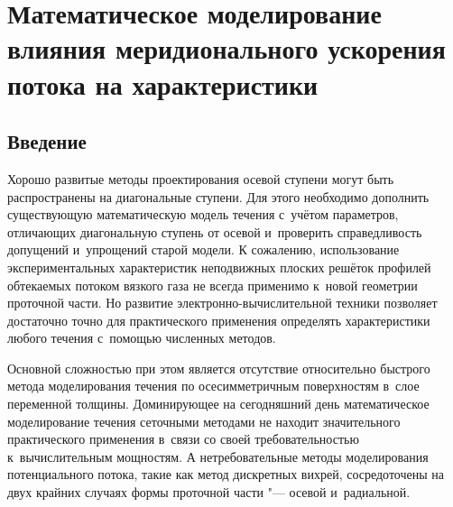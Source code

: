 
\chapter{Математическое моделирование влияния меридионального ускорения потока на характеристики}

\section{Введение}

Хорошо развитые методы проектирования осевой ступени могут быть распространены на диагональные ступени.
Для этого необходимо дополнить существующую математическую модель течения с~учётом параметров, отличающих диагональную ступень от осевой и~проверить справедливость допущений и~упрощений старой модели.
К сожалению, использование экспериментальных характеристик неподвижных плоских решёток профилей обтекаемых потоком вязкого газа не всегда применимо к~новой геометрии проточной части.
Но развитие электронно-вычислительной техники позволяет достаточно точно для практического применения определять характеристики любого течения с~помощью численных методов.

Основной сложностью при этом является отсутствие относительно быстрого метода моделирования течения по осесимметричным поверхностям в~слое переменной толщины.
Доминирующее на сегодняшний день математическое моделирование течения сеточными методами не находит значительного практического применения в~связи со своей требовательностью к~вычислительным мощностям.
А нетребовательные методы моделирования потенциального потока, такие как метод дискретных вихрей, сосредоточены на двух крайних случаях формы проточной части "--- осевой и~радиальной.


